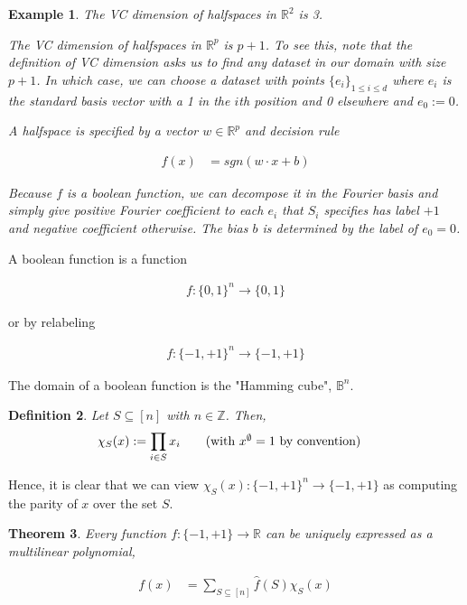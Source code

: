 \documentclass[12]{amsart}
\newcommand\0{\mathbf{0}}
\newcommand\RR{\mathbb{R}}
\newcommand\ZZ{\mathbb{Z}}
\newcommand\<{\langle}
\renewcommand\>{\rangle}
\newtheorem{theorem}{Theorem}[section]
\newtheorem{definition}[theorem]{Definition}
\newtheorem{example}[theorem]{Example}
\begin{document}
\begin{example}
The VC dimension of halfspaces in $\RR^2$ is 3.

The VC dimension of halfspaces in $\RR^p$ is $p+1$. To see this, note that the definition of VC dimension asks us to find \textit{any} dataset in our domain with size $p + 1$. 	In which case, we can choose a dataset with points $\{ e_i \}_{1 \leq i \leq d}$ where $e_i$ is the standard basis vector with a 1 in the $i$th position and 0 elsewhere and $e_0 := 0$. 

A halfspace is specified by a vector $w \in \RR^p$ and decision rule 

\begin{align*}
f(x) &= sgn(w \cdot x + b)
\end{align*}
 
Because $f$ is a boolean function, we can decompose it in the Fourier basis and simply give positive Fourier coefficient to each $e_i$ that $S_i$ specifies has label $+1$ and negative coefficient otherwise. The bias $b$ is determined by the label of $e_0 = 0$.
\end{example}

A boolean function is a function

\begin{align*}
f: \{ 0, 1\}^n \rightarrow \{ 0, 1\}	
\end{align*}

or by relabeling 

\begin{align*}
f: \{ -1, +1 \}^n \rightarrow \{-1, +1\}	
\end{align*}

The domain of a boolean function is the "Hamming cube", $\mathbb{B}^n$. 

\begin{definition}
Let $S \subseteq [n]$ with $n \in \ZZ$. Then,
\begin{align*}
\chi_S(x) &:= \prod_{i\in S} x_i \tag{with $x^{\emptyset} = 1$ by convention}
\end{align*}	
\end{definition}

Hence, it is clear that we can view $\chi_S(x): \{-1, +1\}^n \rightarrow \{-1, +1\}$ as computing the parity of $x$ over the set $S$. 

\begin{theorem}
\label{thm:fourier-bool}
Every function $f: \{ -1, +1 \} \rightarrow \RR$ can be uniquely expressed as a multilinear polynomial,

\begin{align*}
f(x) &= \sum_{S \subseteq [n]}	\hat{f}(S)\chi_S(x)
\end{align*}
\end{theorem}
\end{document}
